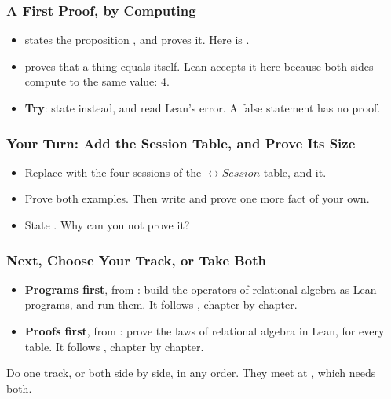 \documentclass{ltx-talk}
\begin{document}
\begin{frame*}
  \frametitle{A First Proof, by Computing}
  \begin{itemize}
    \item {} states the proposition , and
      proves it. Here  is .
    \item {} proves that a thing equals itself. Lean accepts it
      here because both sides compute to the same value: 4.
    \item \textbf{Try}: state  instead, and read
      Lean's error. A false statement has no proof.
  \end{itemize}
\end{frame*}

\begin{frame*}
  \frametitle{Your Turn: Add the Session Table, and Prove Its Size}
  \begin{itemize}
    \item {} Replace  with the four sessions of the
      $\rel{Session}$ table, and  it.
    \item {} Prove both examples. Then write and prove one more fact
      of your own.
    \item {} State . Why can you not prove
      it?
  \end{itemize}
\end{frame*}

\begin{frame}
  \frametitle{Next, Choose Your Track, or Take Both}
  \begin{itemize}
    \item \textbf{Programs first}, from : build the
      operators of relational algebra as Lean programs, and run them. It
      follows , chapter by chapter.
    \item \textbf{Proofs first}, from : prove the laws of
      relational algebra in Lean, for every table. It follows
      , chapter by chapter.
  \end{itemize}
  \begin{sticky}
    Do one track, or both side by side, in any order. They meet at
    , which needs both.
  \end{sticky}
\end{frame}
\end{document}
